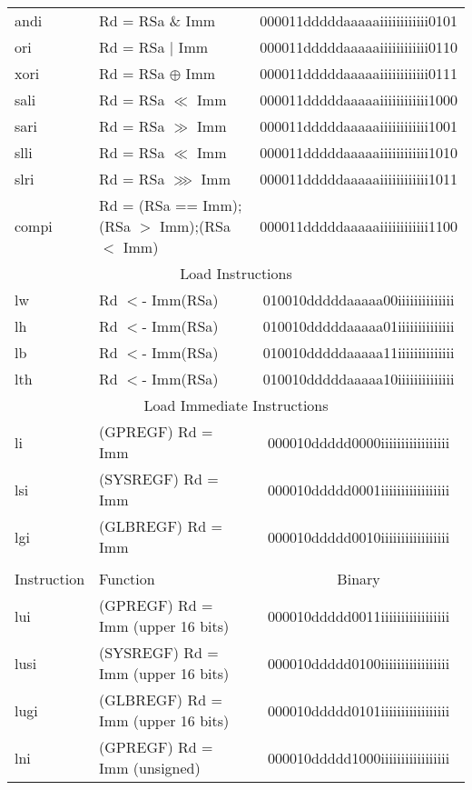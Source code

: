 \documentclass[letterpaper, 11pt]{article}
\begin{document}
\begin{center}
\begin{longtable}{|l|l|c|}
			andi		& Rd = RSa \& Imm								& 000011dddddaaaaaiiiiiiiiiiii0101 \\
			ori			& Rd = RSa $|$ Imm 								& 000011dddddaaaaaiiiiiiiiiiii0110 \\
			xori		& Rd = RSa $\oplus$ Imm 						& 000011dddddaaaaaiiiiiiiiiiii0111 \\
			sali		& Rd = RSa $\ll$ Imm 							& 000011dddddaaaaaiiiiiiiiiiii1000 \\
			sari		& Rd = RSa $\gg$ Imm 							& 000011dddddaaaaaiiiiiiiiiiii1001 \\
			slli		& Rd = RSa $\ll$ Imm 							& 000011dddddaaaaaiiiiiiiiiiii1010 \\
			slri		& Rd = RSa $ \ggg  $ Imm 						& 000011dddddaaaaaiiiiiiiiiiii1011 \\
			compi		& Rd = (RSa == Imm);(RSa $>$ Imm);(RSa $<$ Imm)	& 000011dddddaaaaaiiiiiiiiiiii1100 \\
			\hline
			\multicolumn{3}{|c|}{Load Instructions} \\ \hline
			lw			& Rd $<$- Imm(RSa)								& 010010dddddaaaaa00iiiiiiiiiiiiii \\
			lh			& Rd $<$- Imm(RSa)								& 010010dddddaaaaa01iiiiiiiiiiiiii \\
			lb			& Rd $<$- Imm(RSa)								& 010010dddddaaaaa11iiiiiiiiiiiiii \\
			lth			& Rd $<$- Imm(RSa)								& 010010dddddaaaaa10iiiiiiiiiiiiii \\
			\hline
			\multicolumn{3}{|c|}{Load Immediate Instructions} \\ \hline
			li			& (GPREGF) Rd = Imm								& 000010ddddd0000iiiiiiiiiiiiiiiii \\
			lsi			& (SYSREGF) Rd = Imm							& 000010ddddd0001iiiiiiiiiiiiiiiii \\
			lgi			& (GLBREGF) Rd = Imm								& 000010ddddd0010iiiiiiiiiiiiiiiii \\
			\hline \newpage
			\hline
			\multicolumn{3}{|c|}{Load Immediate Instructions (cont.)} \\ \hline
			Instruction & Function 										& Binary \\ \hline
			lui			& (GPREGF) Rd = Imm	(upper 16 bits)				& 000010ddddd0011iiiiiiiiiiiiiiiii \\
			lusi		& (SYSREGF) Rd = Imm (upper 16 bits)			& 000010ddddd0100iiiiiiiiiiiiiiiii \\
			lugi		& (GLBREGF) Rd = Imm	 (upper 16 bits)			& 000010ddddd0101iiiiiiiiiiiiiiiii \\
			lni			& (GPREGF) Rd = Imm	(unsigned)					& 000010ddddd1000iiiiiiiiiiiiiiiii \\

\end{longtable}
\end{center}
\end{document}
